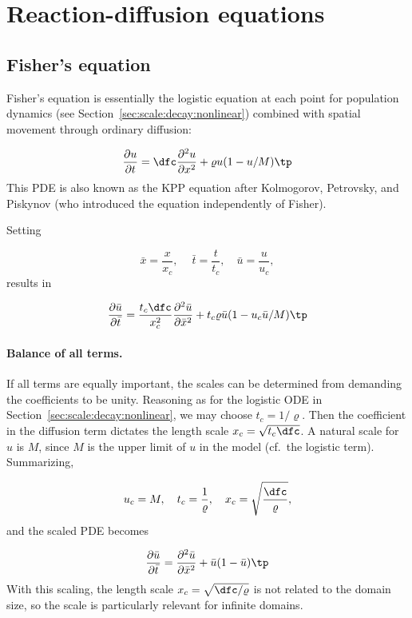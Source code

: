 \documentclass[graybox,envcountchap,sectrefs,final]{svmonodo}
\begin{document}
\section{Reaction-diffusion equations}
\label{sec:scale:diffu:Fisher}

\subsection{Fisher's equation}

Fisher's equation is essentially the logistic equation at each point
for population dynamics (see Section~\ref{sec:scale:decay:nonlinear})
combined with spatial movement through ordinary diffusion:

\begin{equation}
\frac{\partial u}{\partial t} =
\dfc\frac{\partial^2 u}{\partial x^2} + \varrho u(1-u/M)
\tp
\label{sec:scale:diffu:Fisher:pde}
\end{equation}
This PDE is also known as the KPP equation after
Kolmogorov, Petrovsky, and Piskynov (who introduced the equation
independently of Fisher).

Setting

\[ \bar x = \frac{x}{x_c},\quad
\ \bar t = \frac{t}{t_c}, \quad\bar u =\frac{u}{u_c},\]
results in

\[
\frac{\partial \bar u}{\partial \bar t} =
\frac{t_c\dfc}{x_c^2}
\frac{\partial^2\bar u}{\partial\bar x^2} + t_c \varrho \bar u (1 - u_c\bar u/M)\tp
\]

\paragraph{Balance of all terms.}
If all terms are equally important, the scales can be determined from
demanding the coefficients to be unity.
Reasoning as for the logistic ODE in Section~\ref{sec:scale:decay:nonlinear},
we may choose $t_c=1/\varrho$. Then
the coefficient in the diffusion term dictates the length scale $x_c =
\sqrt{t_c\dfc}$.
A natural scale for $u$ is $M$, since $M$ is the upper limit of $u$ in
the model (cf.~the logistic term). Summarizing,

\[ u_c=M,\quad t_c = \frac{1}{\varrho},\quad x_c = \sqrt{\frac{\dfc}{\varrho}},
\]
and the scaled PDE becomes

\begin{equation}
\frac{\partial \bar u}{\partial \bar t} =
\frac{\partial^2 \bar u}{\partial\bar x^2} + \bar u (1 - \bar u)\tp
\end{equation}
With this scaling, the length scale $x_c=\sqrt{\dfc/\varrho}$
is not related to the domain size, so the scale is particularly relevant for
infinite domains.
\end{document}

